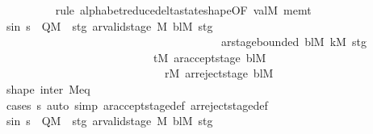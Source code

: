 \begin{isabellebody}
\ \ \ \ \ \ \ \ \isamarkupfalse%
\ {\isacharparenleft}{\kern0pt}rule\ alphabet{\isacharunderscore}{\kern0pt}reduce{\isacharunderscore}{\kern0pt}delta{\isacharunderscore}{\kern0pt}state{\isacharunderscore}{\kern0pt}shape{\isacharbrackleft}{\kern0pt}OF\ valM\ mem{\isacharunderscore}{\kern0pt}t{\isacharbrackright}{\kern0pt}{\isacharparenright}{\kern0pt}\isanewline
\ \ \ \ \ \ \isamarkupfalse%
\ s{\isacharunderscore}{\kern0pt}in{\isacharcolon}{\kern0pt}\ {\isachardoublequoteopen}s\ {\isasymin}\ {\isacharparenleft}{\kern0pt}Q\isactrlsub M\ {\isasymtimes}\ {\isacharbraceleft}{\kern0pt}stg{\isachardot}{\kern0pt}\ ar{\isacharunderscore}{\kern0pt}valid{\isacharunderscore}{\kern0pt}stage\ {\isasymGamma}\isactrlsub M\ bl\isactrlsub M\ stg\isanewline
\ \ \ \ \ \ \ \ \ \ \ \ \ \ \ \ \ \ \ \ \ \ \ \ \ \ \ \ \ \ \ \ \ \ \ \ \ \ {\isasymand}\ ar{\isacharunderscore}{\kern0pt}stage{\isacharunderscore}{\kern0pt}bounded\ bl\isactrlsub M\ k\isactrlsub M\ stg{\isacharbraceright}{\kern0pt}{\isacharparenright}{\kern0pt}\isanewline
\ \ \ \ \ \ \ \ \ \ \ \ \ \ \ \ \ \ \ \ \ \ \ \ \ \ {\isacharminus}{\kern0pt}\ {\isacharbraceleft}{\kern0pt}{\isacharparenleft}{\kern0pt}t\isactrlsub M{\isacharcomma}{\kern0pt}\ ar{\isacharunderscore}{\kern0pt}accept{\isacharunderscore}{\kern0pt}stage\ bl\isactrlsub M{\isacharparenright}{\kern0pt}{\isacharcomma}{\kern0pt}\isanewline
\ \ \ \ \ \ \ \ \ \ \ \ \ \ \ \ \ \ \ \ \ \ \ \ \ \ \ \ \ {\isacharparenleft}{\kern0pt}r\isactrlsub M{\isacharcomma}{\kern0pt}\ ar{\isacharunderscore}{\kern0pt}reject{\isacharunderscore}{\kern0pt}stage\ bl\isactrlsub M{\isacharparenright}{\kern0pt}{\isacharbraceright}{\kern0pt}{\isachardoublequoteclose}\isanewline
\ \ \ \ \ \ \ \ \isamarkupfalse%
\ shape\ inter\ M{\isacharunderscore}{\kern0pt}eq\isanewline
\ \ \ \ \ \ \ \ \isamarkupfalse%
\ {\isacharparenleft}{\kern0pt}cases\ s{\isacharparenright}{\kern0pt}\ {\isacharparenleft}{\kern0pt}auto\ simp{\isacharcolon}{\kern0pt}\ ar{\isacharunderscore}{\kern0pt}accept{\isacharunderscore}{\kern0pt}stage{\isacharunderscore}{\kern0pt}def\ ar{\isacharunderscore}{\kern0pt}reject{\isacharunderscore}{\kern0pt}stage{\isacharunderscore}{\kern0pt}def{\isacharparenright}{\kern0pt}\isanewline
\ \ \ \ \ \ \isamarkupfalse%
\ s{\isacharprime}{\kern0pt}{\isacharunderscore}{\kern0pt}in{\isacharcolon}{\kern0pt}\ {\isachardoublequoteopen}s{\isacharprime}{\kern0pt}\ {\isasymin}\ Q\isactrlsub M\ {\isasymtimes}\ {\isacharbraceleft}{\kern0pt}stg{\isachardot}{\kern0pt}\ ar{\isacharunderscore}{\kern0pt}valid{\isacharunderscore}{\kern0pt}stage\ {\isasymGamma}\isactrlsub M\ bl\isactrlsub M\ stg\isanewline

\end{isabellebody}
